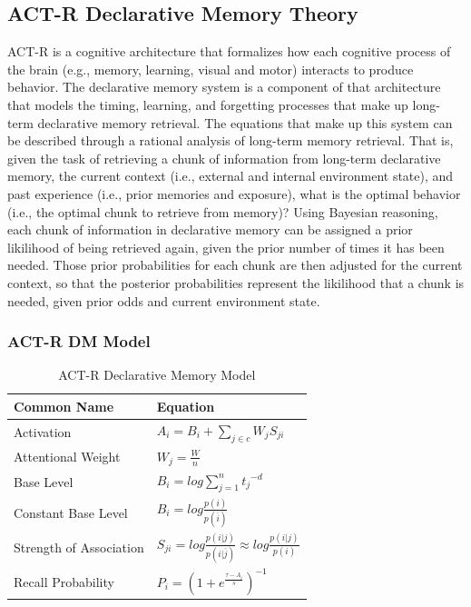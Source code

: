 \documentclass[man,floatsintext]{apa6}
\begin{document}
\subsection{ACT-R Declarative Memory Theory}

ACT-R \parencite{Anderson2004} is a cognitive architecture that formalizes how each cognitive process of the brain (e.g., memory, learning, visual and motor) interacts to produce behavior.
The declarative memory system is a component of that architecture that models the timing, learning, and forgetting processes that make up long-term declarative memory retrieval.
The equations that make up this system can be described through a rational analysis of long-term memory retrieval.
That is, given the task of retrieving a chunk of information from long-term declarative memory,
the current context (i.e., external and internal environment state), and past experience (i.e., prior memories and exposure), 
what is the optimal behavior (i.e., the optimal chunk to retrieve from memory)?
Using Bayesian reasoning, each chunk of information in declarative memory can be assigned a prior likilihood of being retrieved again, given the prior number of times it has been needed.
Those prior probabilities for each chunk are then adjusted for the current context, so that the posterior probabilities represent the likilihood that a chunk is needed, given prior odds and current environment state.

\subsubsection{ACT-R DM Model}

\begin{table}[!ht]
  \caption{ACT-R Declarative Memory Model}
  \label{tabACT-RModel}
  {\tabulinesep=1.2mm
    \begin{tabu}{ll}
      \hline
      Common Name &  Equation \\
      \hline
      Activation &	 	$A_{i} = B_{i} + \sum_{j \in c}^{} W_{j} S_{ji}$ \\
      Attentional Weight &	$W_{j} = \frac{W}{n}$ \\
      Base Level & 		$B_{i} = log \sum_{j=1}^{n} {t_{j}}^{-d}$ \\
      Constant Base Level &	$B_{i} = log \frac{p(i)}{p(\overline{i})}$ \\
      Strength of Association &	$S_{ji} = log \frac{p(i|j)}{p(i|\overline{j})} \approx log \frac{p(i|j)}{p(i)}$ \\
      Recall Probability &	$P_{i} = \left( 1 + e^{\frac{\tau - A_{i}}{s}} \right )^{-1}$ \\
      \hline
    \end{tabu}
  }
\end{table}
\end{document}
